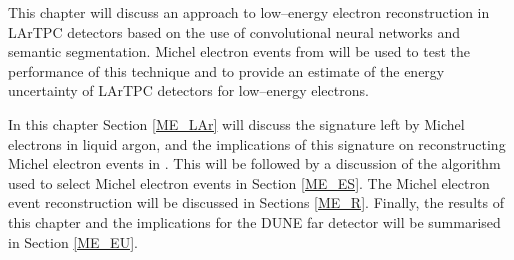 This chapter will discuss an approach to low--energy electron reconstruction 
in LArTPC detectors based on the use of convolutional neural networks and 
semantic segmentation. Michel electron events from \protodune{} will be used 
to test the performance of this technique and to provide an estimate of the 
energy uncertainty of LArTPC detectors for low--energy electrons.

In this chapter Section \ref{ME_LAr} will discuss the signature left by Michel
electrons in liquid argon, and the implications of this signature on
reconstructing Michel electron events in \protodune{}. This will be followed by
a discussion of the algorithm used to select Michel electron events in Section
\ref{ME_ES}. The Michel electron event reconstruction will be discussed in
Sections \ref{ME_R}. Finally, the results of this chapter and the implications
for the DUNE far detector will be summarised in Section \ref{ME_EU}.

